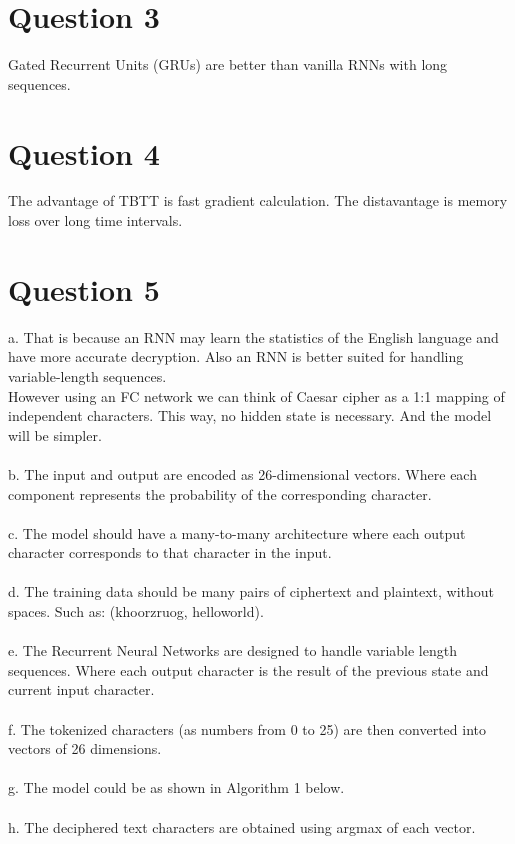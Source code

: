 \documentclass[10pt]{article}
\begin{document}
\section{Question 3}
Gated Recurrent Units (GRUs) are better than vanilla RNNs with long sequences.

\section{Question 4}
The advantage of TBTT is fast gradient calculation. The distavantage is memory loss over long time intervals.

\section{Question 5}
a. That is because an RNN may learn the statistics of the English language and have more accurate decryption. Also an RNN is better suited for handling variable-length sequences.\\
However using an FC network we can think of Caesar cipher as a 1:1 mapping of independent characters. This way, no hidden state is necessary. And the model will be simpler.\\
\\
b. The input and output are encoded as 26-dimensional vectors. Where each component represents the probability of the corresponding character.\\
\\
c. The model should have a many-to-many architecture where each output character corresponds to that character in the input.\\
\\
d. The training data should be many pairs of ciphertext and plaintext, without spaces. Such as: (khoorzruog, helloworld).\\
\\
e. The Recurrent Neural Networks are designed to handle variable length sequences. Where each output character is the result of the previous state and current input character.\\
\\
f. The tokenized characters (as numbers from 0 to 25) are then converted into vectors of 26 dimensions.\\
\\
g. The model could be as shown in Algorithm 1 below.\\
\\
h. The deciphered text characters are obtained using argmax of each vector.
\end{document}
